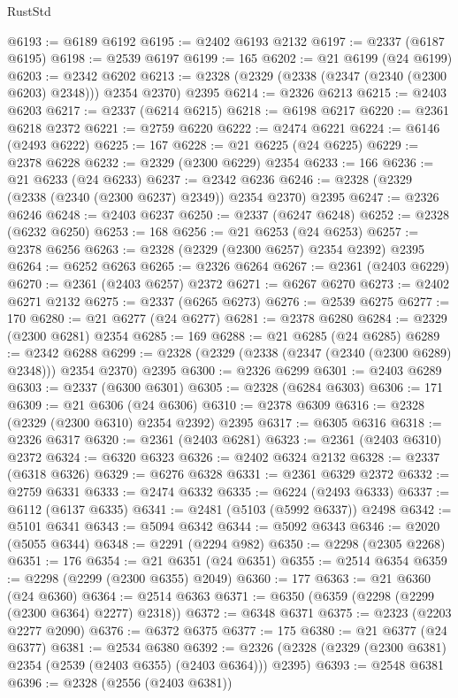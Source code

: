 \begin{lexlean}{RustStd}
\begin{coremodule}
@6193 := @6189 @6192
@6195 := @2402 @6193 @2132
@6197 := @2337 (@6187 @6195)
@6198 := @2539 @6197
@6199 := 165
@6202 := @21 @6199 (@24 @6199)
@6203 := @2342 @6202
@6213 := @2328 (@2329 (@2338 (@2347 (@2340 (@2300 @6203) @2348))) @2354 @2370) @2395
@6214 := @2326 @6213
@6215 := @2403 @6203
@6217 := @2337 (@6214 @6215)
@6218 := @6198 @6217
@6220 := @2361 @6218 @2372
@6221 := @2759 @6220
@6222 := @2474 @6221
@6224 := @6146 (@2493 @6222)
@6225 := 167
@6228 := @21 @6225 (@24 @6225)
@6229 := @2378 @6228
@6232 := @2329 (@2300 @6229) @2354
@6233 := 166
@6236 := @21 @6233 (@24 @6233)
@6237 := @2342 @6236
@6246 := @2328 (@2329 (@2338 (@2340 (@2300 @6237) @2349)) @2354 @2370) @2395
@6247 := @2326 @6246
@6248 := @2403 @6237
@6250 := @2337 (@6247 @6248)
@6252 := @2328 (@6232 @6250)
@6253 := 168
@6256 := @21 @6253 (@24 @6253)
@6257 := @2378 @6256
@6263 := @2328 (@2329 (@2300 @6257) @2354 @2392) @2395
@6264 := @6252 @6263
@6265 := @2326 @6264
@6267 := @2361 (@2403 @6229)
@6270 := @2361 (@2403 @6257) @2372
@6271 := @6267 @6270
@6273 := @2402 @6271 @2132
@6275 := @2337 (@6265 @6273)
@6276 := @2539 @6275
@6277 := 170
@6280 := @21 @6277 (@24 @6277)
@6281 := @2378 @6280
@6284 := @2329 (@2300 @6281) @2354
@6285 := 169
@6288 := @21 @6285 (@24 @6285)
@6289 := @2342 @6288
@6299 := @2328 (@2329 (@2338 (@2347 (@2340 (@2300 @6289) @2348))) @2354 @2370) @2395
@6300 := @2326 @6299
@6301 := @2403 @6289
@6303 := @2337 (@6300 @6301)
@6305 := @2328 (@6284 @6303)
@6306 := 171
@6309 := @21 @6306 (@24 @6306)
@6310 := @2378 @6309
@6316 := @2328 (@2329 (@2300 @6310) @2354 @2392) @2395
@6317 := @6305 @6316
@6318 := @2326 @6317
@6320 := @2361 (@2403 @6281)
@6323 := @2361 (@2403 @6310) @2372
@6324 := @6320 @6323
@6326 := @2402 @6324 @2132
@6328 := @2337 (@6318 @6326)
@6329 := @6276 @6328
@6331 := @2361 @6329 @2372
@6332 := @2759 @6331
@6333 := @2474 @6332
@6335 := @6224 (@2493 @6333)
@6337 := @6112 (@6137 @6335)
@6341 := @2481 (@5103 (@5992 @6337)) @2498
@6342 := @5101 @6341
@6343 := @5094 @6342
@6344 := @5092 @6343
@6346 := @2020 (@5055 @6344)
@6348 := @2291 (@2294 @982)
@6350 := @2298 (@2305 @2268)
@6351 := 176
@6354 := @21 @6351 (@24 @6351)
@6355 := @2514 @6354
@6359 := @2298 (@2299 (@2300 @6355) @2049)
@6360 := 177
@6363 := @21 @6360 (@24 @6360)
@6364 := @2514 @6363
@6371 := @6350 (@6359 (@2298 (@2299 (@2300 @6364) @2277) @2318))
@6372 := @6348 @6371
@6375 := @2323 (@2203 @2277 @2090)
@6376 := @6372 @6375
@6377 := 175
@6380 := @21 @6377 (@24 @6377)
@6381 := @2534 @6380
@6392 := @2326 (@2328 (@2329 (@2300 @6381) @2354 (@2539 (@2403 @6355) (@2403 @6364))) @2395)
@6393 := @2548 @6381
@6396 := @2328 (@2556 (@2403 @6381))

\end{coremodule}
\end{lexlean}
